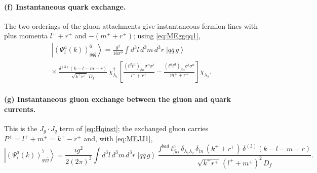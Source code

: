 \documentclass[11pt,a4paper]{article}
\numberwithin{equation}{section}
\newcommand{\ibar}[2]{\draw[line width=1.1pt] (#1-0.13,#2) -- (#1+0.13,#2);}
\newcommand{\ibarh}[2]{\draw[line width=1.1pt] (#1,#2-0.13) -- (#1,#2+0.13);}
\newcommand{\dg}{\dagger}
\newcommand{\dthree}{\delta^{(3)}}
\newcommand{\ket}[1]{\left|#1\right\rangle}
\newcommand{\qk}[3]{q^{#1}_{#2}(#3)}
\newcommand{\aqk}[3]{\bar q^{#1}_{#2}(#3)}
\newcommand{\gl}[3]{g^{#1}_{#2}(#3)}
\begin{document}
\paragraph{(f) Instantaneous quark exchange.}
\begin{center}
\end{center}
The two orderings of the gluon attachments give instantaneous fermion lines with plus momenta
$l^{+}+r^{+}$ and $-(m^{+}+r^{+})$; using \eqref{eq:MEggqq1},
\begin{multline}
\ket{(\Psi^{a}_{i}(k))^{6}_{gq\bar q}}=\frac{g^{2}}{16\pi^{3}}\int\!d^{3}l\,d^{3}m\,d^{3}r\;
\ket{q\bar q\,g}\\
\times\,
\frac{\dthree(k-l-m-r)}{\sqrt{k^{+}r^{+}}\,D_{f}}\,
\chi^{\dg}_{\lambda_{1}}\!\left[\frac{(t^{d}t^{a})_{\beta\alpha}\sigma^{n}\sigma^{i}}{l^{+}+r^{+}}
-\frac{(t^{a}t^{d})_{\beta\alpha}\sigma^{i}\sigma^{n}}{m^{+}+r^{+}}\right]\chi_{\lambda_{2}} .
\label{eq:B3f}
\end{multline}

\paragraph{(g) Instantaneous gluon exchange between the gluon and quark currents.}
\begin{center}
\end{center}
This is the $J_{g}\cdot J_{q}$ term of \eqref{eq:Hqinst}; the exchanged gluon carries
$P^{+}=l^{+}+m^{+}=k^{+}-r^{+}$ and, with \eqref{eq:MEJJ1},
\begin{equation}
\ket{(\Psi^{a}_{i}(k))^{7}_{gq\bar q}}=\frac{ig^{2}}{2(2\pi)^{3}}\int\!d^{3}l\,d^{3}m\,d^{3}r\;
\ket{q\bar q\,g}\,
\frac{f^{bad}\,t^{b}_{\beta\alpha}\,\delta_{\lambda_{1}\lambda_{2}}\,\delta_{in}\,(k^{+}+r^{+})\,
\dthree(k-l-m-r)}{\sqrt{k^{+}r^{+}}\,(l^{+}+m^{+})^{2}\,D_{f}} .
\label{eq:B3g}
\end{equation}
\end{document}

